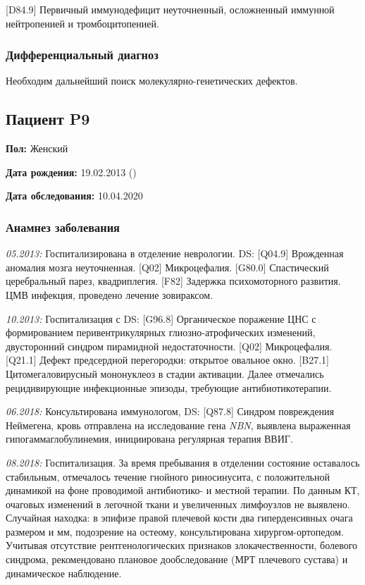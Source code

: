\documentclass[a4paper,14pt]{extarticle}
\newcommand{\mm}{мм}
\newcommand{\genename}[1]{\textit{#1}}
\newcommand{\pdate}[1]{\emph{#1:} }
\newcommand{\DS}[2]{[#2] #1}
\begin{document}
\DS{Первичный иммунодефицит неуточненный, осложненный иммунной нейтропенией и тромбоцитопенией}{D84.9}.

\subsubsection*{Дифференциальный диагноз}

Необходим дальнейший поиск молекулярно-генетических дефектов.

\newpage
\subsection*{Пациент P9}

\textbf{Пол:} Женский

\textbf{Дата рождения:} 19.02.2013 ()

\textbf{Дата обследования:} 10.04.2020

\subsubsection*{Анамнез заболевания}

\pdate{05.2013} Госпитализирована в отделение неврологии. DS: \DS{Врожденная аномалия мозга неуточненная}{Q04.9}. \DS{Микроцефалия}{Q02}. \DS{Спастический церебральный парез, квадриплегия}{G80.0}. \DS{Задержка психомоторного развития}{F82}. ЦМВ инфекция, проведено лечение зовираксом.

\pdate{10.2013} Госпитализация с DS: \DS{Органическое поражение ЦНС с формированием перивентрикулярных глиозно-атрофических изменений, двусторонний синдром пирамидной недостаточности}{G96.8}. \DS{Микроцефалия}{Q02}. \DS{Дефект предсердной перегородки: открытое овальное окно}{Q21.1}. \DS{Цитомегаловирусный мононуклеоз в стадии активации}{B27.1}. 
Далее отмечались рецидивирующие инфекционные эпизоды, требующие антибиотикотерапии. 

\pdate{06.2018} Консультирована иммунологом, DS: \DS{Синдром повреждения Неймегена}{Q87.8}, кровь отправлена на исследование гена \genename{NBN}, выявлена выраженная гипогаммаглобулинемия, инициирована регулярная терапия ВВИГ. 

\pdate{08.2018} Госпитализация. За время пребывания в отделении состояние оставалось стабильным, отмечалось течение гнойного риносинусита, с положительной динамикой на фоне проводимой антибиотико- и местной терапии. По данным КТ, очаговых изменений в легочной ткани и увеличенных лимфоузлов не выявлено. Случайная находка: в эпифизе правой плечевой кости два гиперденсивных очага размером \numprint[\mm]{5} и \numprint[\mm]{2} мм, подозрение на остеому, консультирована хирургом-ортопедом. Учитывая отсутствие рентгенологических признаков злокачественности, болевого синдрома, рекомендовано плановое дообследование (МРТ плечевого сустава) и динамическое наблюдение.
\end{document}
